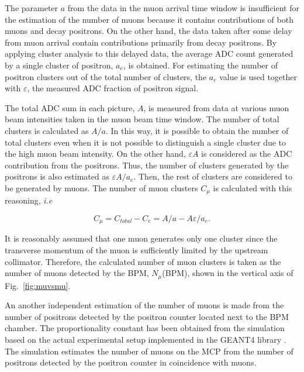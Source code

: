 \documentclass[preprint,3p,twocolumn]{elsarticle}
\begin{document}
The parameter $a$ from the data in the muon arrival time window
is insufficient for the estimation of the number of muons because
it contains contributions of both muons and decay
positrons. On the other hand, the data taken after some delay
from muon arrival contain contributions primarily from decay
positrons. By applying cluster analysis to this delayed data, the average
ADC count generated by a single cluster of positron, $a_e$, is
obtained. For estimating the number of positron clusters out of
the total number of clusters, the $a_e$ value is used together
with $\varepsilon$, the measured ADC fraction of positron signal.

The total ADC sum in each picture, $A$, is measured from data at
various muon beam intensities taken in the muon
beam time window.  The number of total clusters is calculated as $A/a$. In
this way, it is possible to obtain the number of total clusters
even when it is not possible to distinguish a single cluster due
to the high muon beam intensity.  On the other hand,
$\varepsilon A$ is considered as the ADC contribution from the
positrons. Thus, the number of clusters generated by the
positrons is also estimated as $\varepsilon A/a_e$. Then, the
rest of clusters are considered to be generated by muons. The
number of muon clusters $C_{\mu}$ is calculated with this
reasoning, {\it i.e}

\begin{linenomath}
\begin{equation}
C_{\mu} = C_{total} - C_{e}= A/a - A\varepsilon/a_e.
\end{equation}
\end{linenomath}

It is reasonably assumed that one muon generates only one cluster
since the transverse momentum of the muon is sufficiently limited
by the upstream collimator. Therefore, the calculated number of
muon clusters is taken as the number of muons detected by the
BPM, $N_{\mu}$(BPM), shown in the vertical axis of
Fig.~\ref{fig:muvsmu}.

An another independent estimation of the number of muons is made
from the number of positrons detected by the positron counter
located next to the BPM chamber. The proportionality constant has
been obtained from the simulation based on the actual
experimental setup implemented in the GEANT4 library
\cite{geant4}.  The simulation estimates the number of muons on
the MCP from the number of positrons detected by the positron
counter in coincidence with muons.
\end{document}
